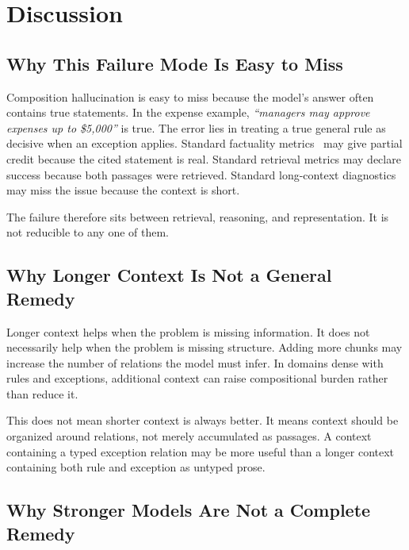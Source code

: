 \documentclass[11pt]{article}
\begin{document}
\section{Discussion}

\subsection{Why This Failure Mode Is Easy to Miss}

Composition hallucination is easy to miss because the model's answer often contains true statements. In the expense example, \emph{``managers may approve expenses up to \$5,000''} is true. The error lies in treating a true general rule as decisive when an exception applies. Standard factuality metrics~\cite{min2023factscore,chen2023felm} may give partial credit because the cited statement is real. Standard retrieval metrics may declare success because both passages were retrieved. Standard long-context diagnostics~\cite{liu2024lost} may miss the issue because the context is short.

The failure therefore sits between retrieval, reasoning, and representation. It is not reducible to any one of them.

\subsection{Why Longer Context Is Not a General Remedy}

Longer context helps when the problem is missing information. It does not necessarily help when the problem is missing structure. Adding more chunks may increase the number of relations the model must infer. In domains dense with rules and exceptions, additional context can raise compositional burden rather than reduce it.

This does not mean shorter context is always better. It means context should be organized around relations, not merely accumulated as passages. A context containing a typed exception relation may be more useful than a longer context containing both rule and exception as untyped prose.

\subsection{Why Stronger Models Are Not a Complete Remedy}
\end{document}
